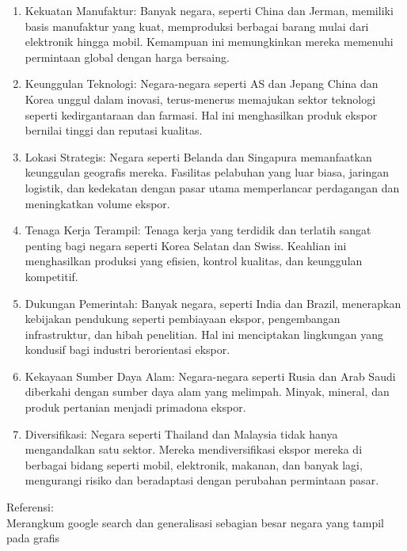 \documentclass[12pt]{article}
\begin{document}
\begin{enumerate}
  \item Kekuatan Manufaktur: Banyak negara, seperti China dan Jerman, memiliki basis manufaktur yang kuat, memproduksi berbagai barang mulai dari elektronik hingga mobil. Kemampuan ini memungkinkan mereka memenuhi permintaan global dengan harga bersaing.
  \item Keunggulan Teknologi: Negara-negara seperti AS dan Jepang China dan Korea unggul dalam inovasi, terus-menerus memajukan sektor teknologi seperti kedirgantaraan dan farmasi. Hal ini menghasilkan produk ekspor bernilai tinggi dan reputasi kualitas.
  \item Lokasi Strategis: Negara seperti Belanda dan Singapura memanfaatkan keunggulan geografis mereka. Fasilitas pelabuhan yang luar biasa, jaringan logistik, dan kedekatan dengan pasar utama memperlancar perdagangan dan meningkatkan volume ekspor. 
  \item Tenaga Kerja Terampil: Tenaga kerja yang terdidik dan terlatih sangat penting bagi negara seperti Korea Selatan dan Swiss. Keahlian ini menghasilkan produksi yang efisien, kontrol kualitas, dan keunggulan kompetitif.
  \item Dukungan Pemerintah: Banyak negara, seperti India dan Brazil, menerapkan kebijakan pendukung seperti pembiayaan ekspor, pengembangan infrastruktur, dan hibah penelitian. Hal ini menciptakan lingkungan yang kondusif bagi industri berorientasi ekspor. 
  \item Kekayaan Sumber Daya Alam: Negara-negara seperti Rusia dan Arab Saudi diberkahi dengan sumber daya alam yang melimpah. Minyak, mineral, dan produk pertanian menjadi primadona ekspor.
  \item Diversifikasi: Negara seperti Thailand dan Malaysia tidak hanya mengandalkan satu sektor. Mereka mendiversifikasi ekspor mereka di berbagai bidang seperti mobil, elektronik, makanan, dan banyak lagi, mengurangi risiko dan beradaptasi dengan perubahan permintaan pasar.
   

\end{enumerate}
\noindent
Referensi:\\
Merangkum google search dan generalisasi sebagian besar negara yang tampil pada grafis
\end{document}
